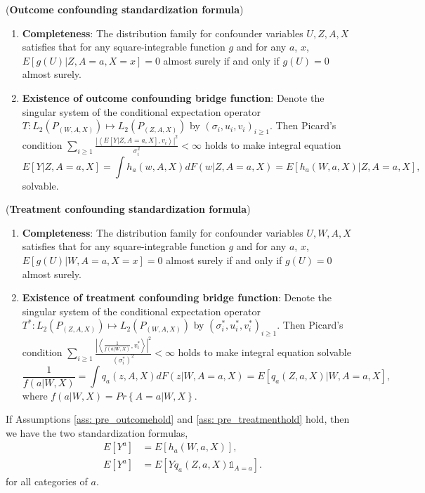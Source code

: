 \begin{assumption}(\textbf{Outcome confounding standardization formula}\cite{WMiao2018})
    
    \label{ass: pre_outcomehold}
    \begin{enumerate}
        \item \textbf{Completeness}: The distribution family for confounder variables $U,Z,A,X$ satisfies that 
                for any square-integrable function $g$ and for any $a$, $x$, $E[g(U)|Z, A = a, X = x] = 0$ almost surely if and only if $g(U) = 0$ almost surely. 
        \item \textbf{Existence of outcome confounding bridge function}: Denote the singular system of the conditional expectation operator $T: L_2(P_{(W,A,X)})\mapsto L_2(P_{(Z,A,X)})$ by $(\sigma_i, u_i, v_i)_{i\geq 1}$. 
                Then Picard's condition $\sum_{i\geq 1}\frac{|\left\langle E[Y|Z,A=a,X], v_i\right\rangle|^2}{\sigma^2_i}<\infty$ holds to make 
                integral equation
                \begin{equation}
                    \label{eq: pre_outbridge}
                    E[Y|Z,A=a,X] = \int h_a(w,A,X)dF(w|Z,A=a,X) = E[h_a(W,a,X)|Z,A=a,X], 
                \end{equation}
                solvable. 
    \end{enumerate}
\end{assumption}

\begin{assumption}(\textbf{Treatment confounding standardization formula}\cite{YFCui2023})

    \label{ass: pre_treatmenthold}
    \begin{enumerate}
        \item \textbf{Completeness}: The distribution family for confounder variables $U,W,A,X$ satisfies that 
                for any square-integrable function $g$ and for any $a$, $x$, $E[g(U)|W, A = a, X = x] = 0$ almost surely if and only if $g(U) = 0$ almost surely.
        \item \textbf{Existence of treatment confounding bridge function}: Denote the singular system of the conditional expectation operator $T^*: L_2(P_{(Z,A,X)})\mapsto L_2(P_{(W,A,X)})$ by $(\sigma^*_i, u^*_i, v^*_i)_{i\geq 1}$. 
                Then Picard's condition $\sum_{i\geq 1}\frac{|\left\langle \frac{1}{f(a|W,X)},v^*_i\right\rangle|^2}{(\sigma^*_i)^2}<\infty$ holds to make 
                integral equation solvable
                \begin{equation}
                    \label{eq: pre_treatbridge}
                    \frac{1}{f(a|W,X)} = \int q_a(z,A,X)dF(z|W,A=a,X) = E[q_a(Z,a,X)|W,A=a,X],
                \end{equation}
                where $f(a|W,X)=Pr\left\{A=a|W,X\right\}$.
    \end{enumerate}
\end{assumption}

If Assumptions \ref{ass: pre_outcomehold} and \ref{ass: pre_treatmenthold} hold, then we have the two standardization formulas, 
\begin{align*}
    E[Y^a] &= E[h_a(W,a,X)], \\
    E[Y^a] &= E[Yq_a(Z,a,X)\mathbb{1}_{A=a}].
\end{align*}
for all categories of $a$.